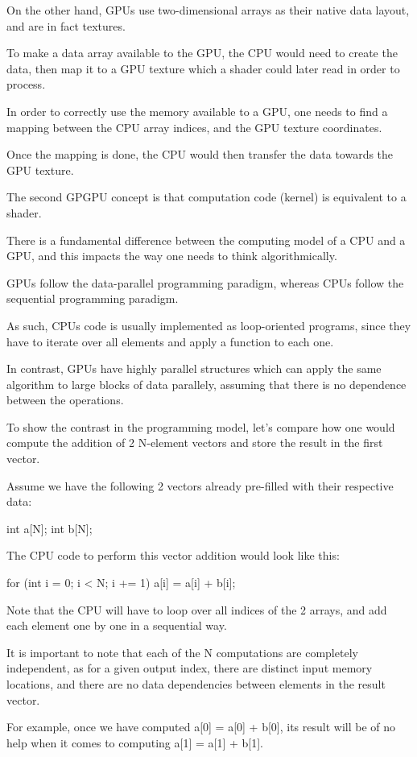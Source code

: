 \documentclass[10pt, a4paper]{report}
\begin{document}
On the other hand, GPUs use two-dimensional arrays as their native data layout,
and are in fact textures.

To make a data array available to the GPU, the CPU would need to create the
data, then map it to a GPU texture which a shader could later read in order to
process.

In order to correctly use the memory available to a GPU, one needs to find a
mapping between the CPU array indices, and the GPU texture coordinates.

Once the mapping is done, the CPU would then transfer the data towards the GPU
texture.

The second GPGPU concept is that computation code (kernel) is equivalent to a
shader.

There is a fundamental difference between the computing model of a CPU and a
GPU, and this impacts the way one needs to think algorithmically.

GPUs follow the data-parallel programming paradigm, whereas CPUs follow the
sequential programming paradigm.

As such, CPUs code is usually implemented as loop-oriented programs, since they
have to iterate over all elements and apply a function to each one.

In contrast, GPUs have highly parallel structures which can apply the same
algorithm to large blocks of data parallely, assuming that there is no
dependence between the operations.

To show the contrast in the programming model, let's compare how one would
compute the addition of 2 N-element vectors and store the result in the first
vector.

Assume we have the following 2 vectors already pre-filled with their respective
data:

int a[N];
int b[N];

The CPU code to perform this vector addition would look like this:

for (int i = 0; i < N; i += 1)
{
    a[i] = a[i] + b[i];
}

Note that the CPU will have to loop over all indices of the 2 arrays, and add
each element one by one in a sequential way.

It is important to note that each of the N computations are completely
independent, as for a given output index, there are distinct input memory
locations, and there are no data dependencies between elements in the result
vector.

For example, once we have computed a[0] = a[0] + b[0], its result will be of no
help when it comes to computing a[1] = a[1] + b[1].
\end{document}
